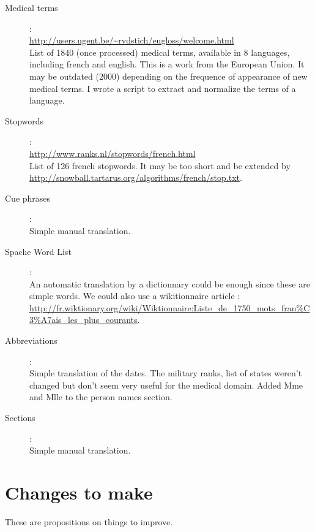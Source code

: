 \documentclass[a4paper,10pt]{article}
\begin{document}
\begin{description}
\item[Medical terms] : \hfill \\
  \url{http://users.ugent.be/~rvdstich/eugloss/welcome.html}\\
  List of 1840 (once processed) medical terms, available in 8
  languages, including french and english. This is a work from the
  European Union. It may be outdated (2000) depending on the frequence
  of appearance of new medical terms.
  I wrote a script to extract and normalize the terms of a language.
\item[Stopwords] : \hfill \\
  \url{http://www.ranks.nl/stopwords/french.html}\\
  List of 126 french stopwords. It may be too short and be extended by
  \url{http://snowball.tartarus.org/algorithms/french/stop.txt}.
\item[Cue phrases] : \hfill \\
  Simple manual translation.
\item[Spache Word List] : \hfill \\
  An automatic translation by a dictionnary could be enough since
  these are simple words. We could also use a wikitionnaire article :
  \url{http://fr.wiktionary.org/wiki/Wiktionnaire:Liste_de_1750_mots_fran%C3%A7ais_les_plus_courants}.

\item[Abbreviations] : \hfill \\
  Simple translation of the dates. The military ranks, list of states
  weren't changed but don't seem very useful for the medical
  domain. Added Mme and Mlle to the person names section.
\item[Sections] : \hfill \\
  Simple manual translation.
  
    


\end{description}


\section{Changes to make}
\label{sec:todo}

These are propositions on things to improve.
\end{document}
